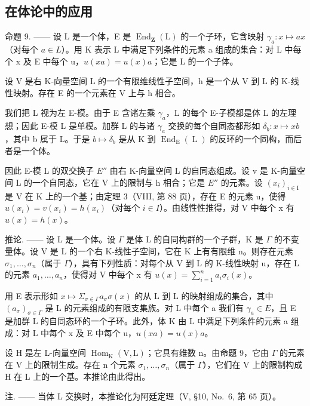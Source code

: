 \subsection{在体论中的应用}

命题 9. —— 设 L 是一个体，E 是 \(\operatorname{End}_{\mathbf{Z}}(\mathrm{L})\) 的一个子环，它含映射 \(\gamma_{a}: x \mapsto ax\)（对每个 \(a \in L\)）。用 K 表示 L 中满足下列条件的元素 a 组成的集合：对 L 中每个 x 及 E 中每个 u，\(u(xa) = u(x)a\)；它是 L 的一个子体。

设 V 是右 K-向量空间 L 的一个有限维线性子空间，h 是一个从 V 到 L 的 K-线性映射。存在 E 的一个元素在 V 上与 h 相合。

我们把 L 视为左 E-模。由于 E 含诸左乘 \(\gamma_{a}\)，L 的每个 E-子模都是体 L 的左理想；因此 E-模 L 是单模。加群 L 的与诸 \(\gamma_{a}\) 交换的每个自同态都形如 \(\delta_{b}: x \mapsto xb\)，其中 b 属于 L。于是 \(b \mapsto \delta_{b}\) 是从 K 到 \(\operatorname{End}_{\operatorname{E}}(\operatorname{L})\) 的反环的一个同构，而后者是一个体。

因此 E-模 L 的双交换子 \(E''\) 由右 K-向量空间 L 的自同态组成。设 v 是 K-向量空间 L 的一个自同态，它在 V 上的限制与 h 相合；它是 \(E''\) 的元素。设 \((x_{i})_{i\in\mathrm{I}}\) 是 V 在 K 上的一个基；由定理 3（VIII, 第 88 页），存在 E 的元素 u，使得 \(u(x_{i}) = v(x_{i}) = h(x_{i})\)（对每个 \(i \in I\)）。由线性性推得，对 V 中每个 x 有 \(u(x) = h(x)\)。

推论. —— 设 L 是一个体。设 \(\Gamma\) 是体 L 的自同构群的一个子群，K 是 \(\Gamma\) 的不变量体。设 V 是 L 的一个右 K-线性子空间，它在 K 上有有限维 n。则存在元素 \(\sigma_{1},\ldots,\sigma_{n}\)（属于 \(\Gamma\)），具有下列性质：对每个从 V 到 L 的 K-线性映射 u，存在 L 的元素 \(a_{1},\ldots,a_{n}\)，使得对 V 中每个 x 有 \(u(x)=\sum_{i=1}^{n}a_{i}\sigma_{i}(x)\)。

用 E 表示形如 \(x \mapsto \Sigma_{\sigma \in \Gamma} a_{\sigma} \sigma(x)\) 的从 L 到 L 的映射组成的集合，其中 \((a_{\sigma})_{\sigma \in \Gamma}\) 是 L 的元素组成的有限支集族。对 L 中每个 a 我们有 \(\gamma_{a} \in E\)，且 E 是加群 L 的自同态环的一个子环。此外，体 K 由 L 中满足下列条件的元素 a 组成：对 L 中每个 x 及 E 中每个 u，\(u(xa) = u(x)a\)。

设 H 是左 L-向量空间 \(\operatorname{Hom}_{\mathrm{K}}(\mathrm{V},\mathrm{L})\)；它具有维数 n。由命题 9，它由 \(\Gamma\) 的元素在 V 上的限制生成。存在 n 个元素 \(\sigma_{1},\ldots,\sigma_{n}\)（属于 \(\Gamma\)），它们在 V 上的限制构成 H 在 L 上的一个基。本推论由此得出。

注. —— 当体 L 交换时，本推论化为阿廷定理（V, §10, No.~6, 第 65 页）。

